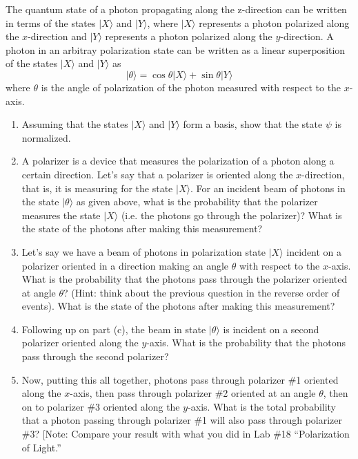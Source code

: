 \begin{problem}
The quantum state of a photon propagating along the z-direction can be written in terms of the states $\vert\mbox{$X$}\rangle$ and $\vert\mbox{$Y$}\rangle$, where $\vert\mbox{$X$}\rangle$ represents a photon polarized along the $x$-direction and $\vert\mbox{$Y$}\rangle$ represents a photon polarized along the $y$-direction. A photon in an arbitray polarization state can be written as a linear superposition of the states $\vert\mbox{$X$}\rangle$ and $\vert\mbox{$Y$}\rangle$ as
\[\vert\theta\rangle = \cos{\theta} \vert\mbox{$X$}\rangle + \sin{\theta} \vert\mbox{$Y$}\rangle \]
where $\theta$ is the angle of polarization of the photon measured with respect to the $x$-axis.
\begin{enumerate}
\item Assuming that the states $\vert\mbox{$X$}\rangle$ and $\vert\mbox{$Y$}\rangle$ form a basis, show that the state $\psi$ is normalized.
\item A polarizer is a device that measures the polarization of a photon along a certain direction.  Let's say that a polarizer is oriented along the $x$-direction, that is, it is measuring for the state $\vert\mbox{$X$}\rangle$. For an incident beam of photons in the state $\vert\mbox{$\theta$}\rangle$ as given above, what is the probability that the polarizer measures the state $\vert\mbox{$X$}\rangle$ (i.e. the photons go through the polarizer)?  What is the state of the photons after making this measurement?
\item Let's say we have a beam of photons in polarization state $\vert\mbox{$X$}\rangle$ incident on a polarizer oriented in a direction making an angle $\theta$ with respect to the $x$-axis.  What is the probability that the photons pass through the polarizer oriented at angle $\theta$? (Hint: think about the previous question in the reverse order of events).  What is the state of the photons after making this measurement?
\item Following up on part (c), the beam in state $\vert\mbox{$\theta$}\rangle$ is incident on a second polarizer oriented along the $y$-axis.  What is the probability that the photons pass through the second polarizer?
\item Now, putting this all together, photons pass through polarizer \#1 oriented along the $x$-axis, then pass through polarizer \#2 oriented at an angle $\theta$, then on to polarizer \#3 oriented along the $y$-axis.  What is the total probability that a photon passing through polarizer \#1 will also pass through polarizer \#3? [Note: Compare your result with what you did in Lab \#18 ``Polarization of Light.''
\end{enumerate}
\end{problem}

